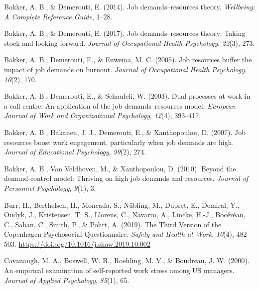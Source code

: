 \documentclass[
  man]{apa6}
\newlength{\cslhangindent}
\newlength{\cslentryspacingunit} %
\newenvironment{CSLReferences}[2] %
 {%
  \setlength{\parindent}{0pt}
  \ifodd #1
  \let\oldpar\par
  \def\par{\hangindent=\cslhangindent\oldpar}
  \fi
  \setlength{\parskip}{#2\cslentryspacingunit}
 }%
 {}
\begin{document}
\begingroup
\setlength{\parindent}{-0.5in}
\setlength{\leftskip}{0.5in}

\hypertarget{refs}{}
\begin{CSLReferences}{1}{0}
\leavevmode{}%
Bakker, A. B., \& Demerouti, E. (2014). Job demands--resources theory. \emph{Wellbeing: A Complete Reference Guide}, 1--28.

\leavevmode{}%
Bakker, A. B., \& Demerouti, E. (2017). Job demands--resources theory: Taking stock and looking forward. \emph{Journal of Occupational Health Psychology}, \emph{22}(3), 273.

\leavevmode{}%
Bakker, A. B., Demerouti, E., \& Euwema, M. C. (2005). Job resources buffer the impact of job demands on burnout. \emph{Journal of Occupational Health Psychology}, \emph{10}(2), 170.

\leavevmode{}%
Bakker, A. B., Demerouti, E., \& Schaufeli, W. (2003). Dual processes at work in a call centre: An application of the job demands--resources model. \emph{European Journal of Work and Organizational Psychology}, \emph{12}(4), 393--417.

\leavevmode{}%
Bakker, A. B., Hakanen, J. J., Demerouti, E., \& Xanthopoulou, D. (2007). Job resources boost work engagement, particularly when job demands are high. \emph{Journal of Educational Psychology}, \emph{99}(2), 274.

\leavevmode{}%
Bakker, A. B., Van Veldhoven, M., \& Xanthopoulou, D. (2010). Beyond the demand-control model: Thriving on high job demands and resources. \emph{Journal of Personnel Psychology}, \emph{9}(1), 3.

\leavevmode{}%
Burr, H., Berthelsen, H., Moncada, S., Nübling, M., Dupret, E., Demiral, Y., Oudyk, J., Kristensen, T. S., Llorens, C., Navarro, A., Lincke, H.-J., Bocéréan, C., Sahan, C., Smith, P., \& Pohrt, A. (2019). The {Third} {Version} of the {Copenhagen} {Psychosocial} {Questionnaire}. \emph{Safety and Health at Work}, \emph{10}(4), 482--503. \url{https://doi.org/10.1016/j.shaw.2019.10.002}

\leavevmode{}%
Cavanaugh, M. A., Boswell, W. R., Roehling, M. V., \& Boudreau, J. W. (2000). An empirical examination of self-reported work stress among US managers. \emph{Journal of Applied Psychology}, \emph{85}(1), 65.


\end{CSLReferences}
\end{document}
